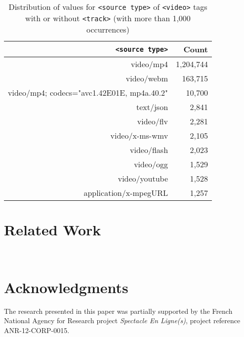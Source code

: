 \documentclass{sig-alternate}
\begin{document}
\begin{table}[p]
  \centering
  \begin{tabular}{ r | r }
    \texttt{<source type>} & Count \\
    \hline
    video/mp4 & 1,204,744\\
    video/webm & 163,715\\
    video/mp4; codecs="avc1.42E01E, mp4a.40.2" & 10,700\\
    text/json & 2,841\\
    video/flv & 2,281\\
    video/x-ms-wmv & 2,105\\
    video/flash & 2,023\\
    video/ogg & 1,529\\
    video/youtube & 1,528\\
    application/x-mpegURL & 1,257\\    
  \end{tabular}
  \caption{Distribution of values for \texttt{<source type>}
    of \texttt{<video>} tags with or without  \texttt{<track>}
    \tiny (with more than 1,000 occurrences)}
  \label{table:typeFull}    
\end{table}

\section{Related Work}

~\cite{yi2012synote}

\section*{Acknowledgments}
\footnotesize
The research presented in this paper was partially supported
by the French National Agency for Research  project
\emph{Spectacle En Ligne(s)}, project reference
\mbox{ANR-12-CORP-0015}.

\normalsize


\end{document}
